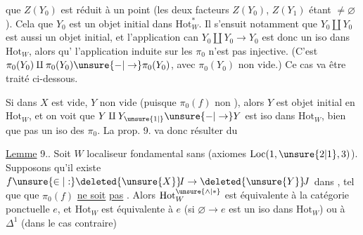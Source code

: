 
que $Z(Y_0)$ est réduit à un point (les deux
facteurs $Z(Y_0)$, $Z(Y_1)$ étant $\ne\varnothing$). Cela
  que $Y_0$ est un objet initial
dans $\mathrm{Hot}_{W}^{*}$. Il s'ensuit notamment
que $Y_0\amalg Y_0$ est aussi un objet initial,
et l'application can $Y_0\amalg Y_0\longrightarrow Y_0$ est donc
un iso dans $\mathrm{Hot}_{W}$, alors qu'
l'application induite sur les $\pi_0$ n'est pas
injective. (C'est $\pi_0(Y_0)\amalg\pi_0(Y_0)\unsure{-|\to}\pi_0(Y_0)$,
avec $\pi_0(Y_0)$ non vide.) Ce cas va être
traité ci-dessous.

Si dans  $X$ est vide, 
$Y$ non vide (puisque $\pi_0(f)$ non ),
alors $Y$ est objet initial en $\mathrm{Hot}_{W}$,
 et on voit  que $Y\amalg Y_{\unsure{1|{}}}\unsure{-|\to}Y$
est iso dans $\mathrm{Hot}_{W}$, bien que 
pas un iso  des $\pi_0$. La prop. 9.
va donc résulter du

\uline{Lemme} 9.. Soit $W$ localiseur fondamental sans  (axiomes $\mathrm{Loc}(1,\unsure{2|1},3)$).
Supposons qu'il existe $f\unsure{\in|:}\deleted{\unsure{X}}\!I\to\deleted{\unsure{Y}}\!J$ dans
, tel que 
que $\pi_0(f)$ \uline{ne soit}
\uline{pas}  .  Alors $\mathrm{Hot}_{W}^{\unsure{\wedge|*}}$
est équivalente à la catégorie ponctuelle \uline{$e$}, et
$\mathrm{Hot}_{W}$ est équivalente à $e$ (si $\varnothing\to e$ est un
iso dans $\mathrm{Hot}_{W}$) ou à $\Delta^1$ (dans le cas contraire)
